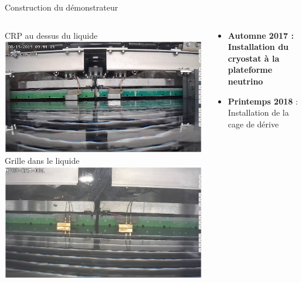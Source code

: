     \begin{frame}{Construction du démonstrateur}
        \begin{columns}
            \begin{column}{0.5\textwidth}
                \centering CRP au dessus du liquide
                \includegraphics[width=\textwidth]{./pictures/crp_out_lar.png}\\\vspace{0.3cm}
                \centering Grille dans le liquide
                \includegraphics[width=\textwidth]{./pictures/crp_in_lar.png}
            \end{column}\hspace{-0.5cm}
            \begin{column}{0.55\textwidth}
                \begin{scriptsize}
                    \begin{itemize}
                        \item \textbf{Automne 2017 : Installation du cryostat à la plateforme neutrino}
                        \item\textbf{Printemps 2018} : Installation de la cage de dérive

\end{itemize}
\end{scriptsize}
\end{column}
\end{columns}
\end{frame}
